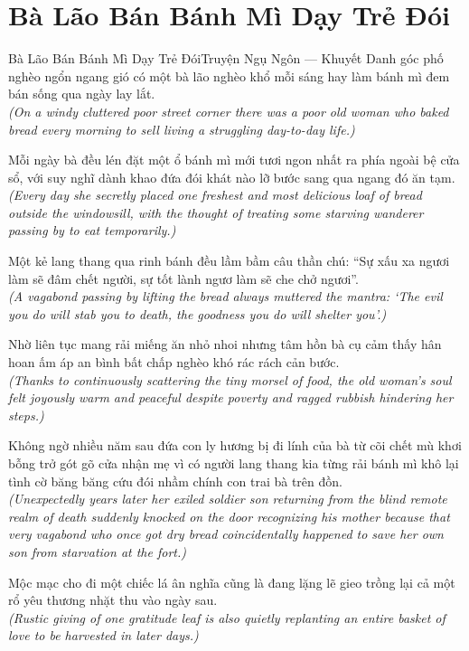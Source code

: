 \section{Bà Lão Bán Bánh Mì Dạy Trẻ Đói}
\begin{truyen}{Bà Lão Bán Bánh Mì Dạy Trẻ Đói}{Truyện Ngụ Ngôn --- Khuyết Danh}
 góc phố nghèo ngổn ngang gió có một bà lão nghèo khổ mỗi sáng hay làm bánh mì đem bán sống qua ngày lay lắt.\\[4pt]
\textit{(On a windy cluttered poor street corner there was a poor old woman who baked bread every morning to sell living a struggling day-to-day life.)}

Mỗi ngày bà đều lén đặt một ổ bánh mì mới tươi ngon nhất ra phía ngoài bệ cửa sổ, với suy nghĩ dành khao đứa đói khát nào lỡ bước sang qua ngang đó ăn tạm.\\[4pt]
\textit{(Every day she secretly placed one freshest and most delicious loaf of bread outside the windowsill, with the thought of treating some starving wanderer passing by to eat temporarily.)}

Một kẻ lang thang qua rinh bánh đều lầm bầm câu thần chú: ``Sự xấu xa ngươi làm sẽ đâm chết người, sự tốt lành ngươ làm sẽ che chở ngươi''.\\[4pt]
\textit{(A vagabond passing by lifting the bread always muttered the mantra: `The evil you do will stab you to death, the goodness you do will shelter you'.)}

Nhờ liên tục mang rải miếng ăn nhỏ nhoi nhưng tâm hồn bà cụ cảm thấy hân hoan ấm áp an bình bất chấp nghèo khó rác rách cản bước.\\[4pt]
\textit{(Thanks to continuously scattering the tiny morsel of food, the old woman's soul felt joyously warm and peaceful despite poverty and ragged rubbish hindering her steps.)}

Không ngờ nhiều năm sau đứa con ly hương bị đi lính của bà từ cõi chết mù khơi bỗng trở gót gõ cửa nhận mẹ vì có người lang thang kia từng rải bánh mì khô lại tình cờ băng băng cứu đói nhầm chính con trai bà trên đồn.\\[4pt]
\textit{(Unexpectedly years later her exiled soldier son returning from the blind remote realm of death suddenly knocked on the door recognizing his mother because that very vagabond who once got dry bread coincidentally happened to save her own son from starvation at the fort.)}

\end{truyen}
\begin{baihoc}
  Mộc mạc cho đi một chiếc lá ân nghĩa cũng là đang lặng lẽ gieo trồng lại cả một rổ yêu thương nhặt thu vào ngày sau.\\[4pt]
  \textit{(Rustic giving of one gratitude leaf is also quietly replanting an entire basket of love to be harvested in later days.)}
\end{baihoc}

